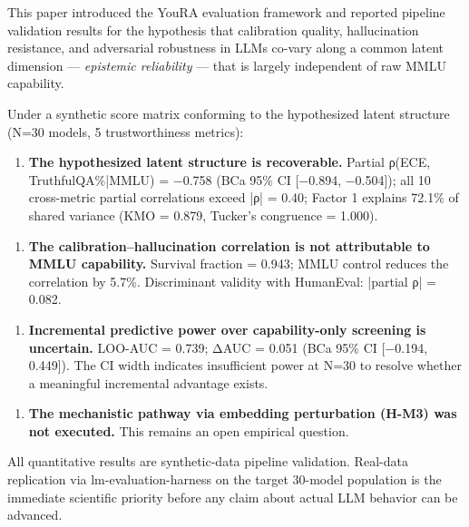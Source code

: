 
This paper introduced the YouRA evaluation framework and reported pipeline validation results for the hypothesis that calibration quality, hallucination resistance, and adversarial robustness in LLMs co-vary along a common latent dimension — \textit{epistemic reliability} — that is largely independent of raw MMLU capability.

Under a synthetic score matrix conforming to the hypothesized latent structure (N=30 models, 5 trustworthiness metrics):

\begin{enumerate}
\item \textbf{The hypothesized latent structure is recoverable.} Partial ρ(ECE, TruthfulQA\%|MMLU) = −0.758 (BCa 95\% CI [−0.894, −0.504]); all 10 cross-metric partial correlations exceed |ρ| = 0.40; Factor 1 explains 72.1\% of shared variance (KMO = 0.879, Tucker's congruence = 1.000).
\end{enumerate}

\begin{enumerate}
\item \textbf{The calibration–hallucination correlation is not attributable to MMLU capability.} Survival fraction = 0.943; MMLU control reduces the correlation by 5.7\%. Discriminant validity with HumanEval: |partial ρ| = 0.082.
\end{enumerate}

\begin{enumerate}
\item \textbf{Incremental predictive power over capability-only screening is uncertain.} LOO-AUC = 0.739; ΔAUC = 0.051 (BCa 95\% CI [−0.194, 0.449]). The CI width indicates insufficient power at N=30 to resolve whether a meaningful incremental advantage exists.
\end{enumerate}

\begin{enumerate}
\item \textbf{The mechanistic pathway via embedding perturbation (H-M3) was not executed.} This remains an open empirical question.
\end{enumerate}

All quantitative results are synthetic-data pipeline validation. Real-data replication via lm-evaluation-harness on the target 30-model population is the immediate scientific priority before any claim about actual LLM behavior can be advanced.

